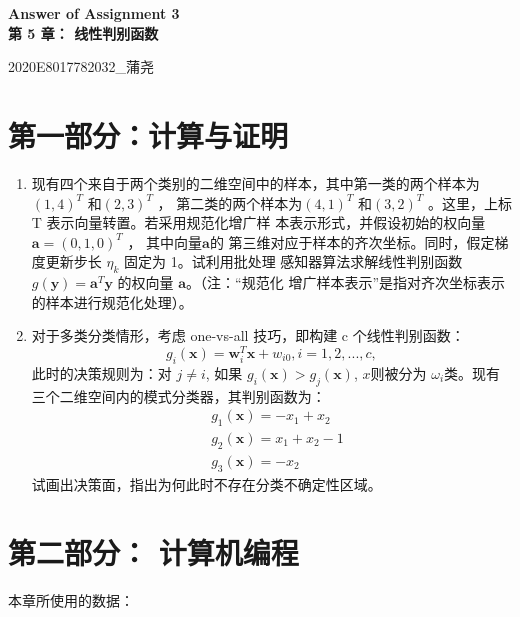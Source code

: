 \documentclass[a4paper,11pt,onecolumn,oneside,UTF8]{article}
\begin{document}
\begin{center}
    \Large\textbf{Answer of Assignment 3\\第 5 章： 线性判别函数}
\end{center}

\begin{flushright}
    2020E8017782032\_蒲尧
\end{flushright}

\section*{第一部分：计算与证明}

\begin{enumerate}
    \item
          现有四个来自于两个类别的二维空间中的样本，其中第一类的两个样本为$(1,4)^T$ 和$(2,3)^T$ ，
          第二类的两个样本为$(4,1)^T$ 和$(3,2)^T$ 。这里，上标 T 表示向量转置。若采用规范化增广样
          本表示形式，并假设初始的权向量 $\bm a=(0,1,0)^T$ ，{\color{blue} 其中向量$\bm a$的
          第三维对应于样本的齐次坐标}。同时，假定梯度更新步长 $\eta_k$ 固定为 1。试利用批处理
          感知器算法求解线性判别函数 $g(\bm y)=\bm a^T\bm y$ 的权向量 $\bm a$。（注：“规范化
          增广样本表示”是指对齐次坐标表示的样本进行规范化处理）。
    \item 对于多类分类情形，考虑 one-vs-all 技巧，即构建 c 个线性判别函数：
          $$g_i(\bm x) =  \bm w_i^T\bm x+w_{i0}, i = 1,2,...,c,$$
          此时的决策规则为：对 $j \neq i$, 如果 $g_i(\bm x) > g_j(\bm x)$, $x$则被分为
          $\omega_i$类。现有三个二维空间内的模式分类器，其判别函数为：
          $$
              \begin{aligned}
                   & g_1(\bm x) = −x_1 + x_2   \\
                   & g_2(\bm x) = x_1 + x_2 −1 \\
                   & g_3(\bm x) = −x_2
              \end{aligned}
          $$
          试画出决策面，指出为何此时不存在分类不确定性区域。

\end{enumerate}

\section*{第二部分： 计算机编程}

本章所使用的数据：
\end{document}
